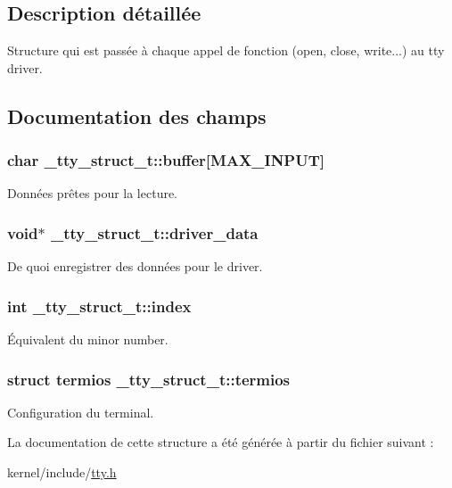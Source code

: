 \subsection{Description détaillée}
Structure qui est passée à chaque appel de fonction (open, close, write...) au tty driver. 

\subsection{Documentation des champs}
\hypertarget{struct__tty__struct__t_ace735f0fca7a2e1c4c75f6ffb9223b19}{
\subsubsection[{buffer}]{\setlength{\rightskip}{0pt plus 5cm}char \-\_\-tty\-\_\-struct\-\_\-t\-::buffer\mbox{[}{\bf M\-A\-X\-\_\-\-I\-N\-P\-U\-T}\mbox{]}}}\label{struct__tty__struct__t_ace735f0fca7a2e1c4c75f6ffb9223b19}
Données prêtes pour la lecture. \hypertarget{struct__tty__struct__t_a974cb784cad13e547e5cace553875f90}{
\subsubsection[{driver\-\_\-data}]{\setlength{\rightskip}{0pt plus 5cm}void$\ast$ \-\_\-tty\-\_\-struct\-\_\-t\-::driver\-\_\-data}}\label{struct__tty__struct__t_a974cb784cad13e547e5cace553875f90}
De quoi enregistrer des données pour le driver. \hypertarget{struct__tty__struct__t_a4208e736cfcd8e0b00a3c0bbfe4674f7}{
\subsubsection[{index}]{\setlength{\rightskip}{0pt plus 5cm}int \-\_\-tty\-\_\-struct\-\_\-t\-::index}}\label{struct__tty__struct__t_a4208e736cfcd8e0b00a3c0bbfe4674f7}
Équivalent du minor number. \hypertarget{struct__tty__struct__t_a39471b82fd4e3a235744e73775ac2523}{
\subsubsection[{termios}]{\setlength{\rightskip}{0pt plus 5cm}struct {\bf termios} \-\_\-tty\-\_\-struct\-\_\-t\-::termios}}\label{struct__tty__struct__t_a39471b82fd4e3a235744e73775ac2523}
Configuration du terminal. 

La documentation de cette structure a été générée à partir du fichier suivant \-:\begin{DoxyCompactItemize}
\item 
kernel/include/\hyperlink{tty_8h}{tty.\-h}\end{DoxyCompactItemize}
